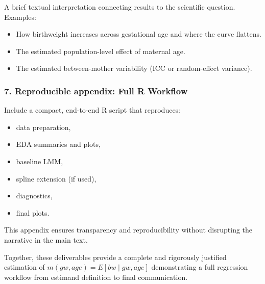 \documentclass[
  letterpaper,
  DIV=11,
  numbers=noendperiod]{scrreprt}
\providecommand{\tightlist}{%
  \setlength{\itemsep}{0pt}\setlength{\parskip}{0pt}}\usepackage{longtable,booktabs,array}
\begin{document}
A brief textual interpretation connecting results to the scientific
question. Examples:

\begin{itemize}
\tightlist
\item
  How birthweight increases across gestational age and where the curve
  flattens.\\
\item
  The estimated population-level effect of maternal age.\\
\item
  The estimated between-mother variability (ICC or random-effect
  variance).
\end{itemize}

\hypertarget{reproducible-appendix-full-r-workflow}{%
\subsubsection*{\texorpdfstring{\textbf{7. Reproducible appendix: Full R
Workflow}}{7. Reproducible appendix: Full R Workflow}}\label{reproducible-appendix-full-r-workflow}}

Include a compact, end-to-end R script that reproduces:

\begin{itemize}
\tightlist
\item
  data preparation,\\
\item
  EDA summaries and plots,\\
\item
  baseline LMM,\\
\item
  spline extension (if used),\\
\item
  diagnostics,\\
\item
  final plots.
\end{itemize}

This appendix ensures transparency and reproducibility without
disrupting the narrative in the main text.

Together, these deliverables provide a complete and rigorously justified
estimation of \(m(gw, age) = E[bw \mid gw, age]\) demonstrating a full
regression workflow from estimand definition to final communication.
\end{document}

